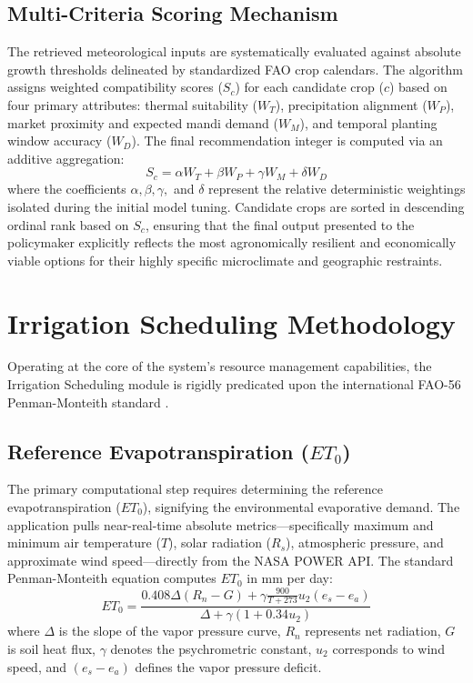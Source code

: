 \subsection{Multi-Criteria Scoring Mechanism}
The retrieved meteorological inputs are systematically evaluated against absolute growth thresholds delineated by standardized FAO crop calendars. The algorithm assigns weighted compatibility scores ($S_{c}$) for each candidate crop ($c$) based on four primary attributes: thermal suitability ($W_{T}$), precipitation alignment ($W_{P}$), market proximity and expected mandi demand ($W_{M}$), and temporal planting window accuracy ($W_{D}$). The final recommendation integer is computed via an additive aggregation:
\begin{equation}
    S_{c} = \alpha W_{T} + \beta W_{P} + \gamma W_{M} + \delta W_{D}
\end{equation}
where the coefficients $\alpha, \beta, \gamma,$ and $\delta$ represent the relative deterministic weightings isolated during the initial model tuning. Candidate crops are sorted in descending ordinal rank based on $S_{c}$, ensuring that the final output presented to the policymaker explicitly reflects the most agronomically resilient and economically viable options for their highly specific microclimate and geographic restraints.

\section{Irrigation Scheduling Methodology}

Operating at the core of the system's resource management capabilities, the Irrigation Scheduling module is rigidly predicated upon the international FAO-56 Penman-Monteith standard \cite{allen1998crop}.

\subsection{Reference Evapotranspiration ($ET_0$)}
The primary computational step requires determining the reference evapotranspiration ($ET_0$), signifying the environmental evaporative demand. The application pulls near-real-time absolute metrics---specifically maximum and minimum air temperature ($T$), solar radiation ($R_s$), atmospheric pressure, and approximate wind speed---directly from the NASA POWER API. The standard Penman-Monteith equation computes $ET_0$ in mm per day:
\begin{equation}
    ET_0 = \frac{0.408 \Delta (R_n - G) + \gamma \frac{900}{T + 273} u_2 (e_s - e_a)}{\Delta + \gamma (1 + 0.34 u_2)}
\end{equation}
where $\Delta$ is the slope of the vapor pressure curve, $R_n$ represents net radiation, $G$ is soil heat flux, $\gamma$ denotes the psychrometric constant, $u_2$ corresponds to wind speed, and $(e_s - e_a)$ defines the vapor pressure deficit.

